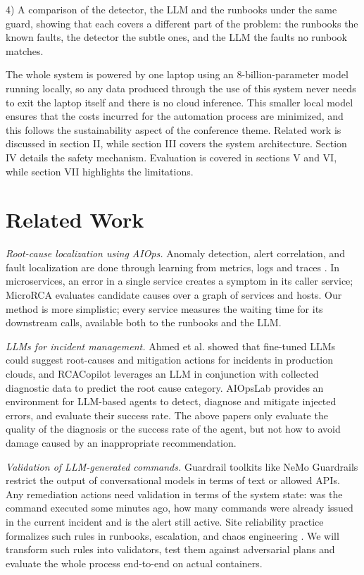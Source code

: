 \documentclass[conference,a4paper]{IEEEtran}
\begin{document}
4) A comparison of the detector, the LLM and the runbooks under the same guard, showing that each covers a different part of the problem: the runbooks the known faults, the detector the subtle ones, and the LLM the faults no runbook matches.

The whole system is powered by one laptop using an 8-billion-parameter model running locally, so any data produced through the use of this system never needs to exit the laptop itself and there is no cloud inference. This smaller local model ensures that the costs incurred for the automation process are minimized, and this follows the sustainability aspect of the conference theme. Related work is discussed in section II, while section III covers the system architecture. Section IV details the safety mechanism. Evaluation is covered in sections V and VI, while section VII highlights the limitations.

\section{Related Work}

\textit{Root-cause localization using AIOps.} Anomaly detection, alert correlation, and fault localization are done through learning from metrics, logs and traces \cite{b2}. In microservices, an error in a single service creates a symptom in its caller service; MicroRCA \cite{b7} evaluates candidate causes over a graph of services and hosts. Our method is more simplistic; every service measures the waiting time for its downstream calls, available both to the runbooks and the LLM.

\textit{LLMs for incident management.} Ahmed et al. \cite{b3} showed that fine-tuned LLMs could suggest root-causes and mitigation actions for incidents in production clouds, and RCACopilot \cite{b4} leverages an LLM in conjunction with collected diagnostic data to predict the root cause category. AIOpsLab \cite{b8} provides an environment for LLM-based agents to detect, diagnose and mitigate injected errors, and evaluate their success rate. The above papers only evaluate the quality of the diagnosis or the success rate of the agent, but not how to avoid damage caused by an inappropriate recommendation.

\textit{Validation of LLM-generated commands.} Guardrail toolkits like NeMo Guardrails \cite{b9} restrict the output of conversational models in terms of text or allowed APIs. Any remediation actions need validation in terms of the system state: was the command executed some minutes ago, how many commands were already issued in the current incident and is the alert still active. Site reliability practice \cite{b1} formalizes such rules in runbooks, escalation, and chaos engineering \cite{b10}. We will transform such rules into validators, test them against adversarial plans and evaluate the whole process end-to-end on actual containers.
\end{document}
